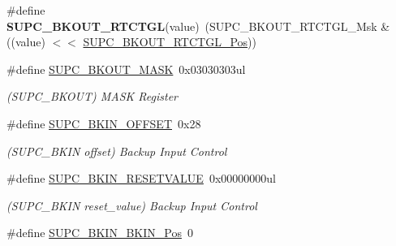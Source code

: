 \begin{DoxyCompactItemize}
\item 
\hypertarget{group___s_a_m_l21___s_u_p_c_gaa48737be39df3807d99cd960d4a02366}{}\#define {\bfseries S\+U\+P\+C\+\_\+\+B\+K\+O\+U\+T\+\_\+\+R\+T\+C\+T\+G\+L}(value)~(S\+U\+P\+C\+\_\+\+B\+K\+O\+U\+T\+\_\+\+R\+T\+C\+T\+G\+L\+\_\+\+Msk \& ((value) $<$$<$ \hyperlink{group___s_a_m_l21___s_u_p_c_ga41b7dbf537a1cc2a51f191d2664e67dc}{S\+U\+P\+C\+\_\+\+B\+K\+O\+U\+T\+\_\+\+R\+T\+C\+T\+G\+L\+\_\+\+Pos}))\label{group___s_a_m_l21___s_u_p_c_gaa48737be39df3807d99cd960d4a02366}

\item 
\hypertarget{group___s_a_m_l21___s_u_p_c_ga8ff4b16b535f918f7cfcb99246a7b576}{}\#define \hyperlink{group___s_a_m_l21___s_u_p_c_ga8ff4b16b535f918f7cfcb99246a7b576}{S\+U\+P\+C\+\_\+\+B\+K\+O\+U\+T\+\_\+\+M\+A\+S\+K}~0x03030303ul\label{group___s_a_m_l21___s_u_p_c_ga8ff4b16b535f918f7cfcb99246a7b576}

\begin{DoxyCompactList}\small\item\em (S\+U\+P\+C\+\_\+\+B\+K\+O\+U\+T) M\+A\+S\+K Register \end{DoxyCompactList}\item 
\hypertarget{group___s_a_m_l21___s_u_p_c_gaac86df69c8754044d83b44bb51b0276c}{}\#define \hyperlink{group___s_a_m_l21___s_u_p_c_gaac86df69c8754044d83b44bb51b0276c}{S\+U\+P\+C\+\_\+\+B\+K\+I\+N\+\_\+\+O\+F\+F\+S\+E\+T}~0x28\label{group___s_a_m_l21___s_u_p_c_gaac86df69c8754044d83b44bb51b0276c}

\begin{DoxyCompactList}\small\item\em (S\+U\+P\+C\+\_\+\+B\+K\+I\+N offset) Backup Input Control \end{DoxyCompactList}\item 
\hypertarget{group___s_a_m_l21___s_u_p_c_ga9e61aa482eb05aeebadde3aaa2337151}{}\#define \hyperlink{group___s_a_m_l21___s_u_p_c_ga9e61aa482eb05aeebadde3aaa2337151}{S\+U\+P\+C\+\_\+\+B\+K\+I\+N\+\_\+\+R\+E\+S\+E\+T\+V\+A\+L\+U\+E}~0x00000000ul\label{group___s_a_m_l21___s_u_p_c_ga9e61aa482eb05aeebadde3aaa2337151}

\begin{DoxyCompactList}\small\item\em (S\+U\+P\+C\+\_\+\+B\+K\+I\+N reset\+\_\+value) Backup Input Control \end{DoxyCompactList}\item 
\hypertarget{group___s_a_m_l21___s_u_p_c_ga0c3e739bf612572843aeeed08421d891}{}\#define \hyperlink{group___s_a_m_l21___s_u_p_c_ga0c3e739bf612572843aeeed08421d891}{S\+U\+P\+C\+\_\+\+B\+K\+I\+N\+\_\+\+B\+K\+I\+N\+\_\+\+Pos}~0\label{group___s_a_m_l21___s_u_p_c_ga0c3e739bf612572843aeeed08421d891}


\end{DoxyCompactItemize}
